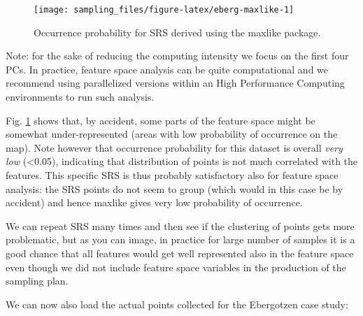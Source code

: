\documentclass[
  graybox,natbib,nospthms]{svmono}
\newenvironment{Shaded}{\begin{snugshade}}{\end{snugshade}}
\newcommand{\DecValTok}[1]{\textcolor[rgb]{0.06,0.06,0.06}{#1}}
\newcommand{\ErrorTok}[1]{\textcolor[rgb]{0.14,0.14,0.14}{\textbf{#1}}}
\newcommand{\FunctionTok}[1]{\textcolor[rgb]{0,0,0}{#1}}
\newcommand{\NormalTok}[1]{#1}
\newcommand{\OtherTok}[1]{\textcolor[rgb]{0.37,0.37,0.37}{#1}}
\newcommand{\SpecialCharTok}[1]{\textcolor[rgb]{0,0,0}{#1}}
\newcommand{\StringTok}[1]{\textcolor[rgb]{0.5,0.5,0.5}{#1}}
\begin{document}
\begin{figure}

{\centering \texttt{[image: sampling\_files/figure-latex/eberg-maxlike-1]} 

}

\caption{Occurrence probability for SRS derived using the maxlike package.}\label{fig:eberg-maxlike}
\end{figure}

Note: for the sake of reducing the computing intensity we focus on the first four PCs.
In practice, feature space analysis can be quite computational and we recommend using
parallelized versions within an High Performance Computing environments to run such analysis.

Fig. \ref{fig:eberg-maxlike} shows that, by accident, some parts of the feature
space might be somewhat under-represented (areas with low probability of occurrence on the map).
Note however that occurrence probability for this dataset is overall \emph{very low} (\textless0.05),
indicating that distribution of points is not much correlated with the features.
This specific SRS is thus probably satisfactory also for feature space analysis:
the SRS points do not seem to group (which would in this case be by accident) and
hence maxlike gives very low probability of occurrence.

We can repeat SRS many times and then see if the clustering of points gets more
problematic, but as you can image, in practice for large number of samples it is
a good chance that all features would get well represented also in the feature
space even though we did not include feature space variables in the production of the
sampling plan.

We can now also load the actual points collected for the Ebergotzen case study:

\begin{Shaded}
\end{Shaded}
\end{document}
